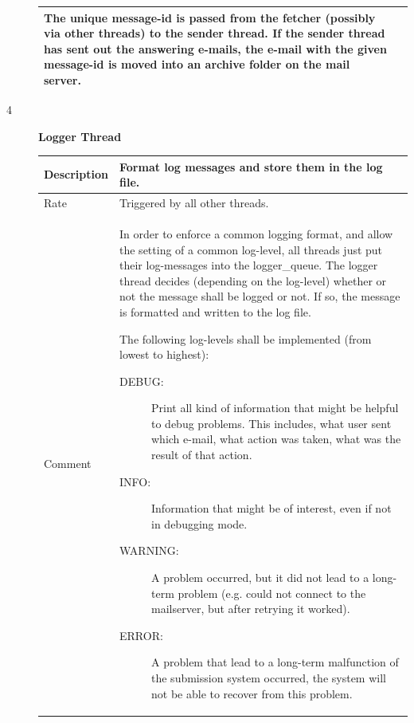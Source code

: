 \begin{description}
\begin{tabular}{|p{2cm}|p{11cm}|}
            The unique message-id is passed from the fetcher (possibly via other threads) to the
            sender thread. If the sender thread has sent out the answering e-mails, the e-mail with
            the given message-id is moved into an archive folder on the mail server.
             \\
        \hline
    \end{tabular}
\newpage
    \item [4] \textbf{Logger Thread}\label{sec:logger} \\
    \begin{tabular}{|p{2cm}|p{11cm}|}
        \hline
        Description & Format log messages and store them in the log file. \\
        \hline
        Rate & Triggered by all other threads. \\
        \hline
         Comment & In order to enforce a common logging format, and allow the setting of a common
            log-level, all threads just put their log-messages into the logger\_queue. The
            logger thread decides (depending on the log-level) whether or not the message shall
            be logged or not. If so, the message is formatted and written to the log file.

            The following log-levels shall be implemented (from lowest to highest):
                \begin{description}
                \item [DEBUG:] Print all kind of information that might be helpful to debug
                    problems. This includes, what user sent which e-mail, what action
                    was taken, what was the result of that action.
                \item [INFO:] Information that might be of interest, even if not in debugging
                    mode.
                \item [WARNING:] A problem occurred, but it did not lead to a long-term problem
                    (e.g. could not connect to the mailserver, but after retrying it worked).
                \item [ERROR:] A problem that lead to a long-term malfunction of the submission
                    system occurred, the system will not be able to recover from this problem.
                \end{description}
        \\
        \hline
    \end{tabular}


\end{description}
